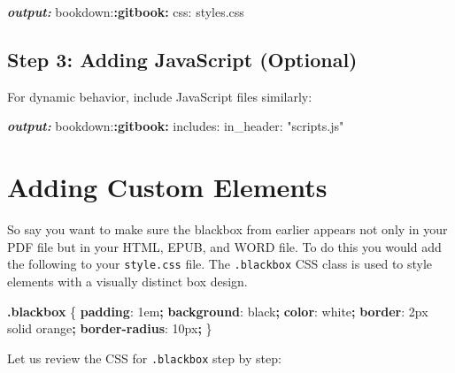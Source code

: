 \documentclass[
]{book}
\newenvironment{Shaded}{\begin{snugshade}}{\end{snugshade}}
\newcommand{\AnnotationTok}[1]{\textcolor[rgb]{0.56,0.35,0.01}{\textbf{\textit{#1}}}}
\newcommand{\CharTok}[1]{\textcolor[rgb]{0.31,0.60,0.02}{#1}}
\newcommand{\ConstantTok}[1]{\textcolor[rgb]{0.56,0.35,0.01}{#1}}
\newcommand{\DataTypeTok}[1]{\textcolor[rgb]{0.13,0.29,0.53}{#1}}
\newcommand{\DecValTok}[1]{\textcolor[rgb]{0.00,0.00,0.81}{#1}}
\newcommand{\FunctionTok}[1]{\textcolor[rgb]{0.13,0.29,0.53}{\textbf{#1}}}
\newcommand{\KeywordTok}[1]{\textcolor[rgb]{0.13,0.29,0.53}{\textbf{#1}}}
\newcommand{\NormalTok}[1]{#1}
\newcommand{\OperatorTok}[1]{\textcolor[rgb]{0.81,0.36,0.00}{\textbf{#1}}}
\newcommand{\SpecialCharTok}[1]{\textcolor[rgb]{0.81,0.36,0.00}{\textbf{#1}}}
\theoremstyle{definition}
\theoremstyle{definition}
\theoremstyle{definition}
\theoremstyle{definition}
\theoremstyle{remark}
\begin{document}
\begin{Shaded}
\begin{Highlighting}[]
\AnnotationTok{output:}
\NormalTok{  bookdown:}\SpecialCharTok{:gitbook:}
\NormalTok{    css: styles.css}
\end{Highlighting}
\end{Shaded}

\subsection{Step 3: Adding JavaScript (Optional)}\label{step-3-adding-javascript-optional}

For dynamic behavior, include JavaScript files similarly:

\begin{Shaded}
\begin{Highlighting}[]
\AnnotationTok{output:}
\NormalTok{  bookdown:}\SpecialCharTok{:gitbook:}
\NormalTok{    includes:}
\NormalTok{      in\_header: "scripts.js"}
\end{Highlighting}
\end{Shaded}

\section{Adding Custom Elements}\label{adding-custom-elements}

So say you want to make sure the blackbox from earlier appears not only in your PDF file but in your HTML, EPUB, and WORD file. To do this you would add the following to your \texttt{style.css} file. The \texttt{.blackbox} CSS class is used to style elements with a visually distinct box design.

\begin{Shaded}
\begin{Highlighting}[]
\FunctionTok{.blackbox}\NormalTok{ \{}
  \KeywordTok{padding}\CharTok{:} \DecValTok{1}\DataTypeTok{em}\OperatorTok{;}
  \KeywordTok{background}\CharTok{:} \ConstantTok{black}\OperatorTok{;}
  \KeywordTok{color}\CharTok{:} \ConstantTok{white}\OperatorTok{;}
  \KeywordTok{border}\CharTok{:} \DecValTok{2}\DataTypeTok{px} \DecValTok{solid} \ConstantTok{orange}\OperatorTok{;}
  \KeywordTok{border{-}radius}\CharTok{:} \DecValTok{10}\DataTypeTok{px}\OperatorTok{;}
\NormalTok{\}}
\end{Highlighting}
\end{Shaded}

Let us review the CSS for \texttt{.blackbox} step by step:
\end{document}
